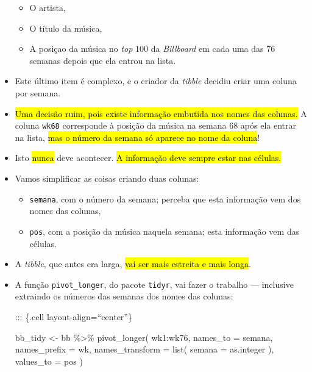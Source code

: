 \documentclass[
  letterpaper,
  DIV=11,
  numbers=noendperiod]{scrreprt}
\newenvironment{Shaded}{\begin{snugshade}}{\end{snugshade}}
\newcommand{\AttributeTok}[1]{\textcolor[rgb]{0.40,0.45,0.13}{#1}}
\newcommand{\FunctionTok}[1]{\textcolor[rgb]{0.28,0.35,0.67}{#1}}
\newcommand{\NormalTok}[1]{\textcolor[rgb]{0.00,0.23,0.31}{#1}}
\newcommand{\OtherTok}[1]{\textcolor[rgb]{0.00,0.23,0.31}{#1}}
\newcommand{\SpecialCharTok}[1]{\textcolor[rgb]{0.37,0.37,0.37}{#1}}
\newcommand{\StringTok}[1]{\textcolor[rgb]{0.13,0.47,0.30}{#1}}
\begin{document}
\begin{itemize}
  \begin{itemize}
  \item
    O artista,
  \item
    O título da música,
  \item
    A posiçao da música no \emph{top} $100$ da \emph{Billboard} em cada
    uma das $76$ semanas depois que ela entrou na lista.
  \end{itemize}
\item
  Este último item é complexo, e o criador da \emph{tibble} decidiu
  criar uma coluna por semana.
\item
  {\hl{Uma decisão ruim, pois existe informação embutida nos nomes das
  colunas.}} A coluna \texttt{wk68} corresponde à posição da música na
  semana $68$ após ela entrar na lista, {\hl{mas o número da semana só
  aparece no nome da coluna}}!
\item
  Isto {\hl{nunca}} deve acontecer. {\hl{A informação deve sempre estar
  nas células.}}
\item
  Vamos simplificar as coisas criando duas colunas:

  \begin{itemize}
  \item
    \texttt{semana}, com o número da semana; perceba que esta informação
    vem dos nomes das colunas,
  \item
    \texttt{pos}, com a posição da música naquela semana; esta
    informação vem das células.
  \end{itemize}
\item
  A \emph{tibble}, que antes era larga, {\hl{vai ser mais estreita e
  mais longa}}.
\item
  A função \texttt{pivot\_longer}, do pacote \texttt{tidyr}, vai fazer o
  trabalho --- inclusive extraindo os números das semanas dos nomes das
  colunas:

  ::: \{.cell layout-align=``center''\}

\begin{Shaded}
\begin{Highlighting}[]
\NormalTok{bb\_tidy }\OtherTok{\textless{}{-}}\NormalTok{ bb }\SpecialCharTok{\%\textgreater{}\%} 
  \FunctionTok{pivot\_longer}\NormalTok{(}
\NormalTok{    wk1}\SpecialCharTok{:}\NormalTok{wk76,}
    \AttributeTok{names\_to =} \StringTok{\textquotesingle{}semana\textquotesingle{}}\NormalTok{,}
    \AttributeTok{names\_prefix =} \StringTok{\textquotesingle{}wk\textquotesingle{}}\NormalTok{,}
    \AttributeTok{names\_transform =} \FunctionTok{list}\NormalTok{(}
      \AttributeTok{semana =}\NormalTok{ as.integer}
\NormalTok{    ),}
    \AttributeTok{values\_to =} \StringTok{\textquotesingle{}pos\textquotesingle{}}
\NormalTok{  )}
\end{Highlighting}
\end{Shaded}


\end{itemize}
\end{document}
